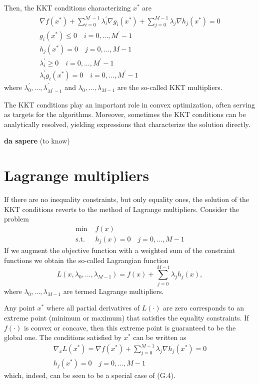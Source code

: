 \documentclass[a4paper, 12pt]{book}
\begin{document}
Then, the KKT conditions characterizing $x^*$ are
\begin{align}
    \nabla f(x^{*})+\sum_{i=0}^{M^{\prime}-1}\lambda_{i}^{\prime}\nabla g_{i}(x^{*})+\sum_{j=0}^{M-1}\lambda_{j}\nabla h_{j}(x^{*})=0 \tag{G.4} \\
    g_{i}(x^{*})\le0 \quad i=0,...,M^{\prime}-1 \nonumber \\
    h_{j}(x^{*})=0 \quad j=0,...,M-1 \nonumber \\
    \lambda_{i}^{\prime}\ge0 \quad i=0,...,M^{\prime}-1 \nonumber \\
    \lambda_{i}^{\prime}g_{i}(x^{*})=0 \quad i=0,...,M^{\prime}-1 \nonumber
\end{align}
where $\lambda_{0}^{\prime},...,\lambda_{M^{\prime}-1}^{\prime}$ and $\lambda_{0},...,\lambda_{M-1}$ are the so-called KKT multipliers.

The KKT conditions play an important role in convex optimization, often serving as targets for the algorithms. Moreover, sometimes the KKT conditions can be analytically resolved, yielding expressions that characterize the solution directly.

\begin{purplebox}[Note]
\textbf{da sapere} (to know)
\end{purplebox}

\section{Lagrange multipliers}
If there are no inequality constraints, but only equality ones, the solution of the KKT conditions reverts to the method of Lagrange multipliers. Consider the problem
\begin{align}
    \text{min } & f(x) \nonumber \\
    \text{s.t. } & h_{j}(x)=0 \quad j=0,...,M-1 \tag{G.5}
\end{align}
If we augment the objective function with a weighted sum of the constraint functions we obtain the so-called Lagrangian function
\begin{equation}
    L(x,\lambda_{0},...,\lambda_{M-1})=f(x)+\sum_{j=0}^{M-1}\lambda_{j}h_{j}(x), \tag{G.6}
\end{equation}
where $\lambda_{0},...,\lambda_{M-1}$ are termed Lagrange multipliers.

Any point $x^{*}$ where all partial derivatives of $L(\cdot)$ are zero corresponds to an extreme point (minimum or maximum) that satisfies the equality constraints. If $f(\cdot)$ is convex or concave, then this extreme point is guaranteed to be the global one. The conditions satisfied by $x^{*}$ can be written as
\begin{align}
    \nabla_{x}L(x^{*})=\nabla f(x^{*})+\sum_{j=0}^{M-1}\lambda_{j}\nabla h_{j}(x^{*})=0 \tag{G.7} \\
    h_{j}(x^{*})=0 \quad j=0,...,M-1 \nonumber
\end{align}
which, indeed, can be seen to be a special case of (G.4).
\end{document}
